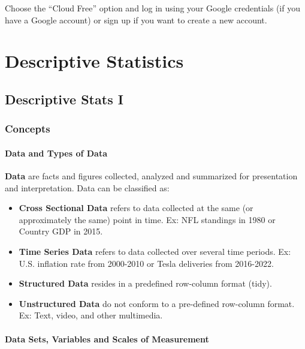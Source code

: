 \documentclass[
  letterpaper,
  DIV=11,
  numbers=noendperiod]{scrreprt}
\begin{document}
Choose the ``Cloud Free'' option and log in using your Google
credentials (if you have a Google account) or sign up if you want to
create a new account.

\part{Descriptive Statistics}

\hypertarget{descriptive-stats-i}{%
\chapter{Descriptive Stats I}\label{descriptive-stats-i}}

\hypertarget{concepts}{%
\section{Concepts}\label{concepts}}

\hypertarget{data-and-types-of-data}{%
\subsection*{Data and Types of Data}\label{data-and-types-of-data}}

\textbf{Data} are facts and figures collected, analyzed and summarized
for presentation and interpretation. Data can be classified as:

\begin{itemize}
\item
  \textbf{Cross Sectional Data} refers to data collected at the same (or
  approximately the same) point in time. Ex: NFL standings in 1980 or
  Country GDP in 2015.
\item
  \textbf{Time Series Data} refers to data collected over several time
  periods. Ex: U.S. inflation rate from 2000-2010 or Tesla deliveries
  from 2016-2022.
\item
  \textbf{Structured Data} resides in a predefined row-column format
  (tidy).
\item
  \textbf{Unstructured Data} do not conform to a pre-defined row-column
  format. Ex: Text, video, and other multimedia.
\end{itemize}

\hypertarget{data-sets-variables-and-scales-of-measurement}{%
\subsection*{Data Sets, Variables and Scales of
Measurement}\label{data-sets-variables-and-scales-of-measurement}}
\end{document}
